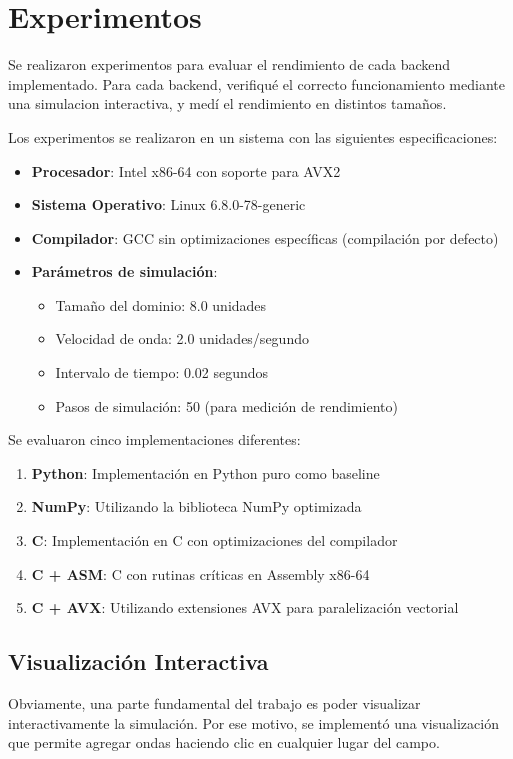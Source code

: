 \documentclass[a4paper]{article}
\begin{document}
\section{Experimentos}

Se realizaron experimentos para evaluar el rendimiento de cada backend implementado. Para cada backend, verifiqué el correcto funcionamiento mediante una simulacion interactiva, y medí el rendimiento en distintos tamaños.

Los experimentos se realizaron en un sistema con las siguientes especificaciones:
\begin{itemize}
    \item \textbf{Procesador}: Intel x86-64 con soporte para AVX2
    \item \textbf{Sistema Operativo}: Linux 6.8.0-78-generic
    \item \textbf{Compilador}: GCC sin optimizaciones específicas (compilación por defecto)
    \item \textbf{Parámetros de simulación}:
          \begin{itemize}
              \item Tamaño del dominio: 8.0 unidades
              \item Velocidad de onda: 2.0 unidades/segundo
              \item Intervalo de tiempo: 0.02 segundos
              \item Pasos de simulación: 50 (para medición de rendimiento)
          \end{itemize}
\end{itemize}

Se evaluaron cinco implementaciones diferentes:
\begin{enumerate}
    \item \textbf{Python}: Implementación en Python puro como baseline
    \item \textbf{NumPy}: Utilizando la biblioteca NumPy optimizada
    \item \textbf{C}: Implementación en C con optimizaciones del compilador
    \item \textbf{C + ASM}: C con rutinas críticas en Assembly x86-64
    \item \textbf{C + AVX}: Utilizando extensiones AVX para paralelización vectorial
\end{enumerate}

\subsection{Visualización Interactiva}
Obviamente, una parte fundamental del trabajo es poder visualizar interactivamente la simulación. Por ese motivo, se implementó una visualización que permite agregar ondas haciendo clic en cualquier lugar del campo.
\end{document}
